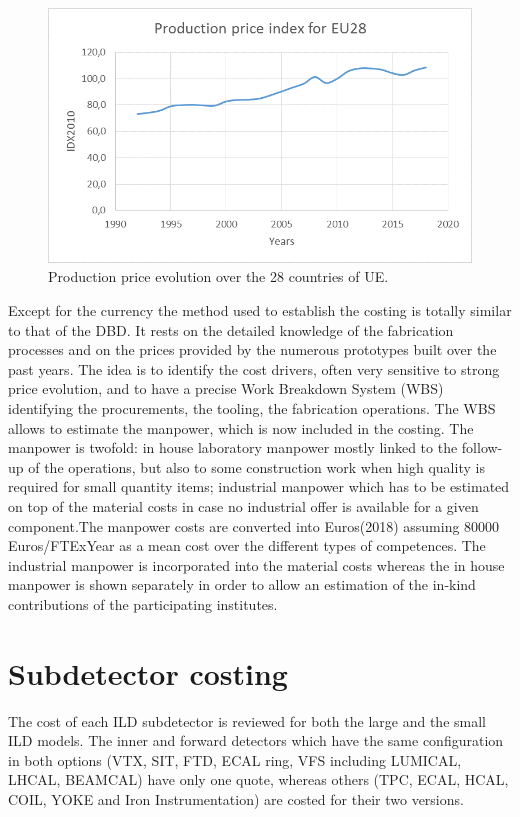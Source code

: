 \begin{figure}[h!]
\centering
\includegraphics[width=1.0\hsize]{Costing/price_index.png}
\caption{Production price evolution over the 28 countries of UE.}
\label{price_index}
\end{figure}

Except for the currency the method used to establish the costing is totally similar to that of the DBD. It rests on the detailed knowledge of the fabrication processes and on the prices provided by the numerous prototypes built over the past years.  The idea is to identify the cost drivers, often very sensitive to strong price evolution, and to have a precise Work Breakdown System (WBS) identifying the procurements, the tooling, the fabrication operations. The WBS allows to estimate the manpower, which is now included in the costing. The manpower is twofold: in house laboratory  manpower mostly linked to the follow-up of the operations, but also to some construction work when high quality is required for small quantity items; industrial manpower which has to be estimated on top of the material costs in case no industrial offer is available for a given component.The manpower costs are converted into Euros(2018) assuming 80000 Euros/FTExYear as a mean cost over the different types of competences. The industrial manpower is incorporated into the material costs whereas the in house manpower is shown separately in order to allow an estimation of the in-kind contributions of the participating institutes. 

\section{Subdetector costing}
The cost of each ILD subdetector is reviewed for both the large and the small ILD models. The inner and forward detectors which have the same configuration in both options (VTX, SIT, FTD, ECAL ring, VFS including LUMICAL, LHCAL, BEAMCAL) have only one quote, whereas others (TPC, ECAL, HCAL, COIL, YOKE and Iron Instrumentation) are costed for their two versions. 

